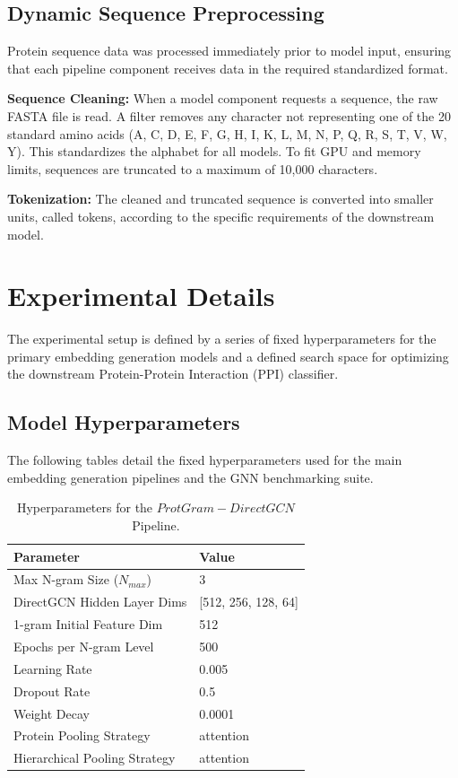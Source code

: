 \documentclass[utf8]{frontiers_suppmat}
\begin{document}
\subsection{Dynamic Sequence Preprocessing}
Protein sequence data was processed immediately prior to model input, ensuring that each pipeline component receives data in the required standardized format.

\textbf{Sequence Cleaning:} When a model component requests a sequence, the raw FASTA file is read. A filter removes any character not representing one of the 20 standard amino acids (A, C, D, E, F, G, H, I, K, L, M, N, P, Q, R, S, T, V, W, Y). This standardizes the alphabet for all models. To fit GPU and memory limits, sequences are truncated to a maximum of 10,000 characters.

\textbf{Tokenization:} The cleaned and truncated sequence is converted into smaller units, called tokens, according to the specific requirements of the downstream model.

	\section*{Experimental Details}
	
	The experimental setup is defined by a series of fixed hyperparameters for the primary embedding generation models and a defined search space for optimizing the downstream Protein-Protein Interaction (PPI) classifier.
	
	\subsection*{Model Hyperparameters}
	
	The following tables detail the fixed hyperparameters used for the main embedding generation pipelines and the GNN benchmarking suite.
	
	\begin{table}[H]
		\centering
		\caption{Hyperparameters for the $ProtGram-DirectGCN$ Pipeline.}
		\label{tab:protgram_params}
		\begin{tabular}{ll}
			\toprule
			\textbf{Parameter} & \textbf{Value} \\
			\midrule
			Max N-gram Size ($N_{max}$) & 3 \\
			DirectGCN Hidden Layer Dims & [512, 256, 128, 64] \\
			1-gram Initial Feature Dim & 512 \\
			Epochs per N-gram Level & 500 \\
			Learning Rate & 0.005 \\
			Dropout Rate & 0.5 \\
			Weight Decay & 0.0001 \\
			Protein Pooling Strategy & attention \\
			Hierarchical Pooling Strategy & attention \\
			\bottomrule
		\end{tabular}
	\end{table}
	
\end{document}
